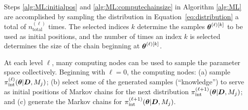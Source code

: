 % 
%  
% 

Steps \ref{alg:ML:initialpos} and \ref{alg:ML:computechainsize} in Algorithm \ref{alg:ML} are accomplished by sampling the distribution in Equation~\eqref{eq:distribution} a total of $n_\text{total}^{(\ell)} $ times. The selected indices $k$ determine the samples $\mbox{\boldmath$ \theta $}^{(\ell) [k]}$ to be used as initial positions, and the number of times an index $k$ is selected determines the size of the chain beginning at $\mbox{\boldmath$ \theta $}^{(\ell) [k]}$.


At each level $\ell$, many computing nodes can be used to sample the parameter space collectively. Beginning with $\ell = 0$, the computing nodes:
(a) sample $\pi_\text{int}^{(\ell)}(\mbox{\boldmath$ \theta $}|\mbox{\boldmath$ D $}, M_j)$; 
(b) select some of the generated samples (``knowledge'') to serve as initial positions of Markov chains for the next distribution $\pi_\text{int}^{(\ell+1)}(\mbox{\boldmath$ \theta $}|\mbox{\boldmath$ D $}, M_j)$; and 
(c) generate the Markov chains for $\pi_\text{int}^{(\ell+1)}(\mbox{\boldmath$ \theta $}|\mbox{\boldmath$ D $}, M_j)$. 


